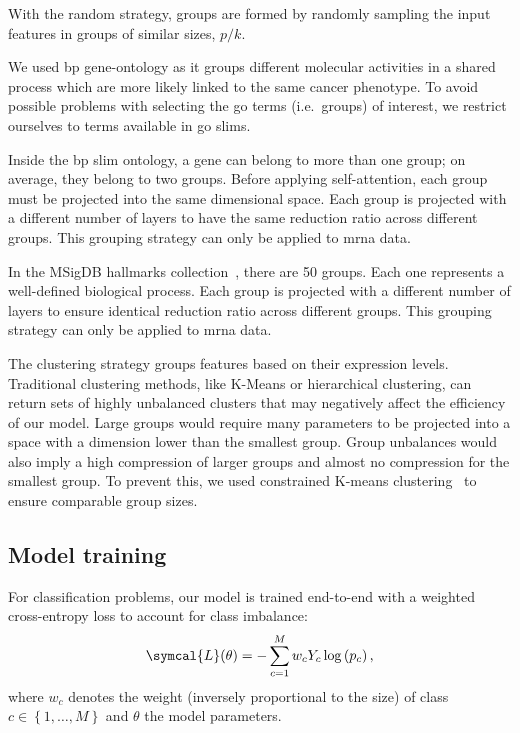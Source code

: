 \documentclass[../main.tex]{subfiles}
\begin{document}
		\begin{description}[
				style=multiline,
				leftmargin=!,
				labelwidth=2.2cm
			]
			\item[Random]
				With the random strategy, groups are formed by randomly sampling the input features in groups of similar sizes, \(p/k\).
			\item[Gene Ontology]
				We used \gls{bp} gene-ontology as it groups different molecular activities in a shared process which are more likely linked to the same cancer phenotype.
				To avoid possible problems with selecting the \gls{go} terms (i.e.\ groups) of interest, we restrict ourselves to terms available in \gls{go} slims.

				Inside the \gls{bp} slim ontology, a gene can belong to more than one group; on average, they belong to two groups.
				Before applying self-attention, each group must be projected into the same dimensional space.
				Each group is projected with a different number of layers to have the same reduction ratio across different groups. This grouping strategy can only be applied to \gls{mrna} data.
			\item[Hallmarks]
				In the MSigDB hallmarks collection~\cite{Liberzon2015}, there are 50 groups.
				Each one represents a well-defined biological process.
				Each group is projected with a different number of layers to ensure identical reduction ratio across different groups. This grouping strategy can only be applied to \gls{mrna} data.
			\item[Clustering]
				The clustering strategy groups features based on their expression levels.
				Traditional clustering methods, like K-Means or hierarchical clustering, can return sets of highly unbalanced clusters that may negatively affect the efficiency of our model.
				Large groups would require many parameters to be projected into a space with a dimension lower than the smallest group.
				Group unbalances would also imply a high compression of larger groups and almost no compression for the smallest group.
				To prevent this, we used constrained K-means clustering~\cite{bradleyConstrainedKMeansClustering} to ensure comparable group sizes.
		\end{description}


	\subsection{Model training}

		For classification problems, our model is trained end-to-end with a weighted cross-entropy loss to account for class imbalance:
		\[ \symcal{L}(\theta) = - \sum_{c=1}^{M}w_c Y_c \log\left( p_c\right) \text{,}\]
		where \(w_c\) denotes the weight (inversely proportional to the size) of class \(c \in \left\{1, \ldots,M \right\}\) and \(\theta\) the model parameters.
\end{document}

